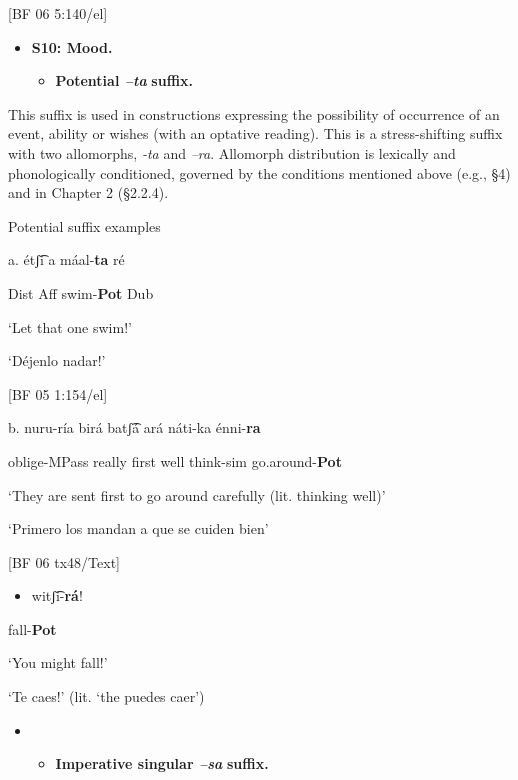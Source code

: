 [BF 06 5:140/el]

\begin{itemize}
\item \textbf{S10: Mood.}

\begin{itemize}
\item \textbf{Potential \textit{–ta} }\textbf{suffix.}
\end{itemize}
\end{itemize}

This suffix is used in constructions expressing the possibility of occurrence of an event, ability or wishes (with an optative reading). This is a stress-shifting suffix with two allomorphs, \textit{{}-ta} and \textit{–ra}. Allomorph distribution is lexically and phonologically conditioned, governed by the conditions mentioned above (e.g., §4) and in Chapter 2 (§2.2.4). 

   Potential suffix examples

a.   étʃ͡i   a   máal-\textbf{ta}   ré

Dist   Aff   swim-\textbf{Pot}   Dub

‘Let that one swim!’

‘Déjenlo nadar!’          

[BF 05 1:154/el]

b.   nuru-ría        birá    batʃ͡á   ará    náti-ka   énni-\textbf{ra} 

oblige-MPass   really  first   well     think-sim  go.around-\textbf{Pot}

   ‘They are sent first to go around carefully (lit. thinking well)’

  ‘Primero los mandan a que se cuiden bien’    

  [BF 06 tx48/Text]


\begin{itemize}
\item witʃ͡i-\textbf{rá}!
\end{itemize}

fall-\textbf{Pot}


    ‘You might fall!’



    ‘Te caes!’ (lit. ‘the puedes caer’)      



\begin{itemize}
\item \begin{itemize}
\item \textbf{Imperative singular \textit{–sa} }\textbf{suffix.}
\end{itemize}
\end{itemize}

